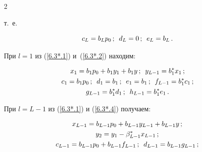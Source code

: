 \begin{multicols}{2}
\begin{equation*}
\end{equation*}


т.\ е.


\begin{equation*}


c_{L} = b_L p_0\,;


\enskip d_{L} = 0\,;


\enskip


e_L= b_L \,.


\end{equation*}




При $l=1$ из (\ref{6.3*.1}) и~(\ref{6.3*.2}) находим:


\begin{gather*}


x_{1} = b_{1} p_0 + b_{1} y_1 + b_{1} y\,;


\enskip 


y_{L-1}= b^*_{1} x_{1} \,;


\\


c_{1} = b_{1} p_0\,; \enskip d_{1}=b_{1}\,;


\enskip 


e_{1} =b_{1}\,;\enskip


f_{L-1}=b^*_{1} c_{1} \,;


\\


g_{L-1}=b^*_{1} d_{1}\,;


\enskip


h_{L-1}= b^*_{1} e_{1}\,.


\end{gather*}


При $l=L-1$ из (\ref{6.3*.1}) и (\ref{6.3*.4}) получаем:





\noindent


\begin{gather*}


x_{L-1} = b_{L-1} p_0 + b_{L-1} y_{L-1} + b_{L-1} y\,;


\\


y_{2}= y_{1} - \beta^*_{L-1} x_{L-1}\,;


\\


c_{L-1} = b_{L-1} p_0 + b_{L-1} f_{L-1} \,;


\enskip


d_{L-1} = b_{L-1} g_{L-1}\,;



\end{gather*}
\end{multicols}
